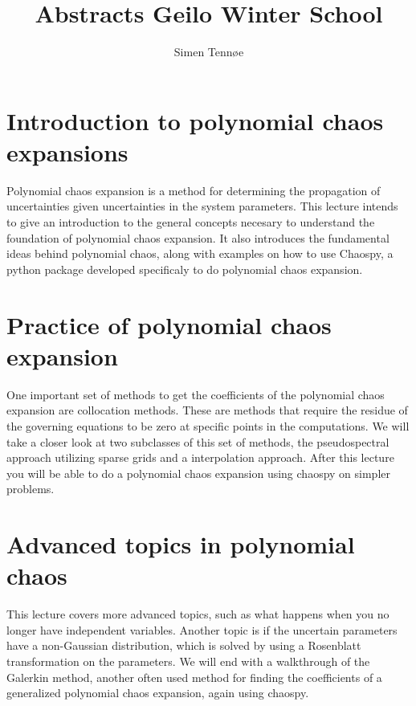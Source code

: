 \documentclass[a4paper,10pt]{article}
\title{Abstracts Geilo Winter School}
\author{Simen Tennøe}
\begin{document}
\maketitle
\newpage


\section{Introduction to polynomial chaos expansions}
Polynomial chaos expansion is a method for determining the propagation of uncertainties given uncertainties in the system parameters. This lecture intends to give an introduction to the general concepts necesary to understand the foundation of polynomial chaos expansion. It also introduces the fundamental ideas behind polynomial chaos, along with examples on how to use Chaospy, a python package developed specificaly to do polynomial chaos expansion.




\section{Practice of polynomial chaos expansion}
One important set of methods to get the coefficients of the polynomial chaos expansion are collocation methods. These are methods that require the residue of the governing equations to be zero at specific points in the computations. We will take a closer look at two subclasses of this set of methods, the pseudospectral approach utilizing sparse grids and a interpolation approach.
After this lecture you will be able to do a polynomial chaos expansion using chaospy on simpler problems.




\section{Advanced topics in polynomial chaos}
This lecture covers more advanced topics, such as what happens when you no longer have independent variables. Another topic is if the uncertain parameters have a non-Gaussian distribution, which is solved by using a Rosenblatt transformation on the parameters. %
We will end with a walkthrough of the Galerkin method, another often used method for finding the coefficients of a generalized polynomial chaos expansion, again using chaospy.
\end{document}
